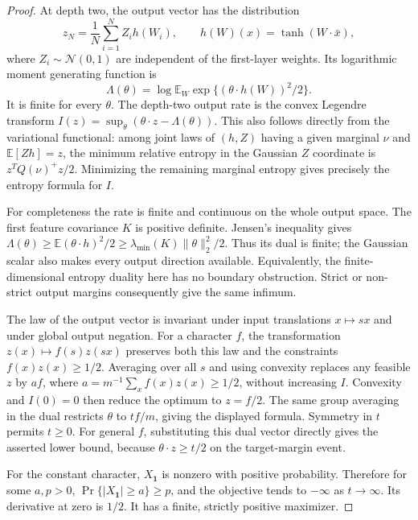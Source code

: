 \begin{proof}
At depth two, the output vector has the distribution
\[
 z_N=\frac1N\sum_{i=1}^N Z_i h(W_i),\qquad
 h(W)(x)=\tanh(W\cdot\bar x),
\]
where $Z_i\sim\mathcal N(0,1)$ are independent of the first-layer
weights. Its logarithmic moment generating function is
\[
 \Lambda(\theta)=
 \log\mathbb E_W\exp\{(\theta\cdot h(W))^2/2\}.
\]
It is finite for every $\theta$. The depth-two output rate is the
convex Legendre transform
$I(z)=\sup_\theta(\theta\cdot z-\Lambda(\theta))$.
This also follows directly from the variational functional: among
joint laws of $(h,Z)$ having a given marginal $\nu$ and
$\mathbb E[Zh]=z$, the minimum relative entropy in the Gaussian
$Z$ coordinate is $z^TQ(\nu)^+z/2$. Minimizing the remaining
marginal entropy gives precisely the entropy formula for $I$.

For completeness the rate is finite and continuous on the whole
output space. The first feature covariance $K$ is positive definite.
Jensen's inequality gives
$\Lambda(\theta)\ge\mathbb E(\theta\cdot h)^2/2
\ge\lambda_{\min}(K)\|\theta\|_2^2/2$. Thus its dual is finite;
the Gaussian scalar also makes every output direction available.
Equivalently, the finite-dimensional entropy duality here has no
boundary obstruction. Strict or non-strict output margins consequently
give the same infimum.

The law of the output vector is invariant under input translations
$x\mapsto sx$ and under global output negation. For a character $f$,
the transformation $z(x)\mapsto f(s)z(sx)$ preserves both this law
and the constraints $f(x)z(x)\ge1/2$. Averaging over all $s$ and
using convexity replaces any feasible $z$ by $af$, where
$a=m^{-1}\sum_xf(x)z(x)\ge1/2$, without increasing $I$.
Convexity and $I(0)=0$ then reduce the optimum to $z=f/2$.
The same group averaging in the dual restricts $\theta$ to
$tf/m$, giving the displayed formula. Symmetry in $t$ permits
$t\ge0$. For general $f$, substituting this dual vector directly
gives the asserted lower bound, because
$\theta\cdot z\ge t/2$ on the target-margin event.

For the constant character, $X_{\mathbf1}$ is nonzero with positive
probability. Therefore for some $a,p>0$,
$\Pr\{|X_{\mathbf1}|\ge a\}\ge p$, and the objective tends to
$-\infty$ as $t\to\infty$. Its derivative at zero is $1/2$.
It has a finite, strictly positive maximizer.
\end{proof}

